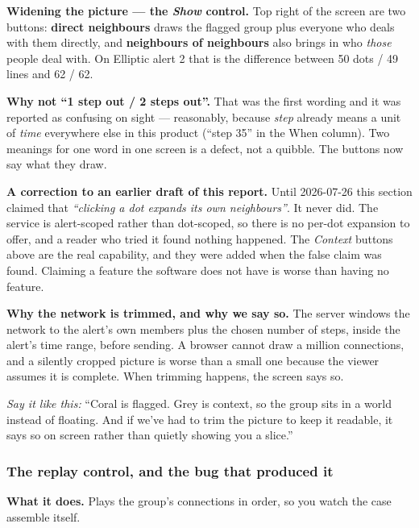 \documentclass[11pt,a4paper]{article}
\newcommand{\aloud}[1]{\par\smallskip\noindent\textit{\textcolor{accent}{Say
it like this:}} ``#1''\par\smallskip}
\begin{document}
\textbf{Widening the picture --- the \emph{Show} control.} Top right of the
screen are two buttons: \textbf{direct neighbours} draws the flagged group plus
everyone who deals with them directly, and \textbf{neighbours of neighbours}
also brings in who \emph{those} people deal with. On Elliptic alert 2 that is
the difference between 50 dots / 49 lines and 62 / 62.

\begin{plain}
\textbf{Why not ``1 step out / 2 steps out''.} That was the first wording and it
was reported as confusing on sight --- reasonably, because \emph{step} already
means a unit of \emph{time} everywhere else in this product (``step 35'' in the
When column). Two meanings for one word in one screen is a defect, not a
quibble. The buttons now say what they draw.
\end{plain}

\begin{plain}
\textbf{A correction to an earlier draft of this report.} Until 2026-07-26 this
section claimed that \emph{``clicking a dot expands its own neighbours''}. It
never did. The service is alert-scoped rather than dot-scoped, so there is no
per-dot expansion to offer, and a reader who tried it found nothing happened.
The \emph{Context} buttons above are the real capability, and they were added
when the false claim was found. Claiming a feature the software does not have is
worse than having no feature.
\end{plain}

\textbf{Why the network is trimmed, and why we say so.} The server windows the
network to the alert's own members plus the chosen number of steps, inside the
alert's time range, before sending. A browser cannot draw a million connections,
and a silently cropped picture is worse than a small one because the viewer
assumes it is complete. When trimming happens, the screen says so.

\aloud{Coral is flagged. Grey is context, so the group sits in a world instead
of floating. And if we've had to trim the picture to keep it readable, it says
so on screen rather than quietly showing you a slice.}

\subsubsection*{The replay control, and the bug that produced it}

\textbf{What it does.} Plays the group's connections in order, so you watch the
case assemble itself.
\end{document}
